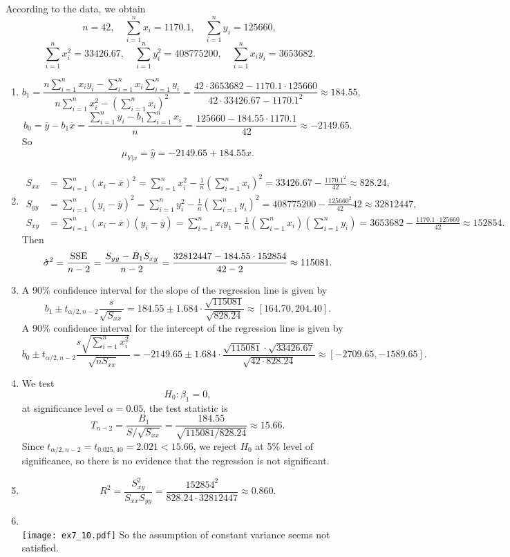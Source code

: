 \documentclass[11pt,a4paper]{article}
\begin{document}
\subsection{}
According to the data, we obtain
$$n=42,\quad \sum_{i=1}^nx_i=1170.1,\quad \sum_{i=1}^ny_i=125660,$$
$$\sum_{i=1}^nx_i^2=33426.67,\quad \sum_{i=1}^ny_i^2=408775200,\quad \sum_{i=1}^nx_iy_i=3653682.$$
\begin{enumerate}[label=\roman*)]
\item
$$b_1=\frac{n\sum\limits_{i=1}^nx_iy_i-\sum\limits_{i=1}^nx_i\sum\limits_{i=1}^ny_i}{n\sum\limits_{i=1}^nx_i^2-\left(\sum\limits_{i=1}^nx_i\right)^2}=\frac{42\cdot3653682-1170.1\cdot125660}{42\cdot33426.67-1170.1^2}\approx184.55,$$
$$b_0=\overline{y}-b_1\overline{x}=\frac{\sum\limits_{i=1}^ny_i-b_1\sum\limits_{i=1}^nx_i}{n}=\frac{125660-184.55\cdot1170.1}{42}\approx-2149.65.$$
So $$\hat{\mu}_{Y|x}=\hat{y}=-2149.65+184.55x.$$
\item
\begin{align*}
S_{xx}&=\sum_{i=1}^n(x_i-\overline{x})^2=\sum_{i=1}^nx_i^2-\frac{1}{n}\left(\sum_{i=1}^nx_i\right)^2=33426.67-\frac{1170.1^2}{42}\approx828.24,\\
S_{yy}&=\sum_{i=1}^n(y_i-\overline{y})^2=\sum_{i=1}^ny_i^2-\frac{1}{n}\left(\sum_{i=1}^ny_i\right)^2=408775200-\frac{125660^2}{42}{42}\approx32812447,\\
S_{xy}&=\sum_{i=1}^n(x_i-\overline{x})(y_i-\overline{y})=\sum_{i=1}^nx_iy_1-\frac{1}{n}\left(\sum_{i=1}^nx_i\right)\left(\sum_{i=1}^ny_i\right)=3653682-\frac{1170.1\cdot125660}{42}\approx152854.
\end{align*}
Then
$$\hat{\sigma}^2=\frac{\rm SSE}{n-2}=\frac{S_{yy}-B_1S_{xy}}{n-2}=\frac{32812447-184.55\cdot152854}{42-2}\approx115081.$$
\item
A 90\% confidence interval for the slope of the regression line is given by
$$b_1\pm t_{\alpha/2,n-2}\frac{s}{\sqrt{S_{xx}}}=184.55\pm1.684\cdot\frac{\sqrt{115081}}{\sqrt{828.24}}\approx[164.70,204.40].$$
A 90\% confidence interval for the intercept of the regression line is given by
$$b_0\pm t_{\alpha/2,n-2}\frac{s\sqrt{\sum\limits_{i=1}^nx_i^2}}{\sqrt{nS_{xx}}}=-2149.65\pm1.684\cdot\frac{\sqrt{115081}\cdot\sqrt{33426.67}}{\sqrt{42\cdot 828.24}}\approx[-2709.65,-1589.65].$$
\item
We test $$H_0:\beta_1=0,$$
at significance level $\alpha=0.05$, the test statistic is
$$T_{n-2}=\frac{B_1}{S/\sqrt{S_{xx}}}=\frac{184.55}{\sqrt{115081/828.24}}\approx15.66.$$
Since $t_{\alpha/2,n-2}=t_{0.025,40}=2.021<15.66$, we reject $H_0$ at 5\% level of significance, so there is no evidence that the regression is not significant.
\item
$$R^2=\frac{S_{xy}^2}{S_{xx}S_{yy}}=\frac{152854^2}{828.24\cdot32812447}\approx0.860.$$
\item\ \\
\texttt{[image: ex7\_10.pdf]}
So the assumption of constant variance seems not satisfied.
\end{enumerate}
\end{document}
